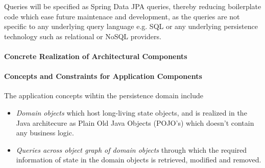 Queries will be specified as Spring Data JPA queries, thereby reducing
boilerplate code which ease future maintenace and development, as the queries
are not specific to any underlying query language e.g. SQL or any underlying
persistence technology such as relational or NoSQL providers.

\paragraph{Concrete Realization of Architectural Components}

\paragraph{Concepts and Constraints for Application Components}
The application concepts wihtin the persistence domain include
\begin{itemize}
	\item \textit{Domain objects} which host long-living state objects, and is realized in the Java architecure as Plain Old Java Objects (POJO's) which doesn't contain any business logic.
	\item \textit{Queries across object graph of domain objects} through which the required information of state in the domain objects is retrieved, modified and removed.
\end{itemize}
